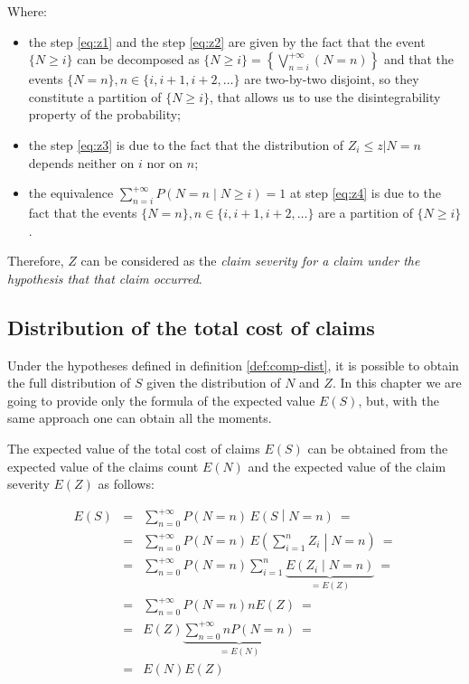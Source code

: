 \documentclass[a4paper, nobind]{templates/ociamthesis}
\providecommand{\tightlist}{%
  \setlength{\itemsep}{0pt}\setlength{\parskip}{0pt}}
\theoremstyle{definition}
\theoremstyle{definition}
\theoremstyle{definition}
\theoremstyle{remark}
\begin{document}
Where:

\begin{itemize}
\tightlist
\item
  the step \eqref{eq:z1} and the step \eqref{eq:z2} are given by the fact that the event \(\{N\ge i\}\) can be decomposed as \(\{N\ge i\} = \left\{ \bigvee_{n = i}^{+\infty}{(N=n)} \right\}\) and that the events \(\{N=n\}, n\in\{i, i+1, i+2, \dots\}\) are two-by-two disjoint, so they constitute a partition of \(\{N\ge i\}\), that allows us to use the disintegrability property of the probability;
\item
  the step \eqref{eq:z3} is due to the fact that the distribution of \(Z_i\le z | N=n\) depends neither on \(i\) nor on \(n\);
\item
  the equivalence \(\sum_{n=i}^{+\infty}{P\left( N = n \middle| N\ge i \right)} = 1\) at step \eqref{eq:z4} is due to the fact that the events \(\{N=n\}, n\in\{i, i+1, i+2, \dots\}\) are a partition of \(\{N\ge i\}\).
\end{itemize}

Therefore, \(Z\) can be considered as the \emph{claim severity for a claim under the hypothesis that that claim occurred}.

\hypertarget{chap:tcc-dist}{%
\subsection{Distribution of the total cost of claims}\label{chap:tcc-dist}}

Under the hypotheses defined in definition \ref{def:comp-dist}, it is possible to obtain the full distribution of \(S\) given the distribution of \(N\) and \(Z\). In this chapter we are going to provide only the formula of the expected value \(E(S)\), but, with the same approach one can obtain all the moments.

The expected value of the total cost of claims \(E(S)\) can be obtained from the expected value of the claims count \(E(N)\) and the expected value of the claim severity \(E(Z)\) as follows:

\begin{eqnarray}
\label{eq:s1}
E(S) & = & \sum_{n=0}^{+\infty}{P(N=n) \, E\left(S \middle| N = n \right)}
\ = \\ \label{eq:s2} & = &
\sum_{n=0}^{+\infty}{P(N=n) \, E\left(\sum_{i=1}^{n}{Z_i} \middle| N = n \right)}
\ = \\ \label{eq:s3} & = &
\sum_{n=0}^{+\infty}{P(N=n) \sum_{i=1}^{n}{\underbrace{E\left( Z_i \middle| N = n \right)}_{=E(Z)}}}
\ = \\ \label{eq:s4} & = &
\sum_{n=0}^{+\infty}{P(N=n) n E(Z)}
\ = \\ \label{eq:s5} & = &
E(Z) \underbrace{\sum_{n=0}^{+\infty}{n P(N=n)}}_{=E(N)}
\ = \\ \label{eq:s6} & = &
E(N)E(Z)
\end{eqnarray}
\end{document}
